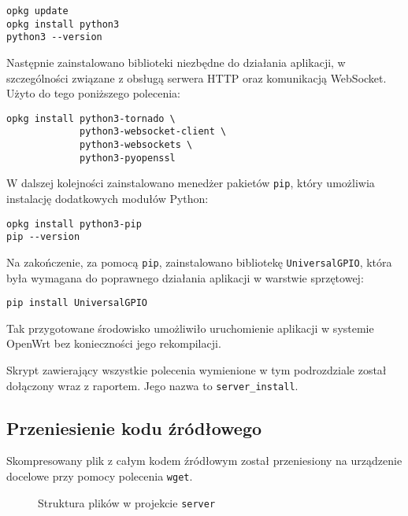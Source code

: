 \documentclass{article}
\begin{document}
\begin{verbatim}
opkg update
opkg install python3
python3 --version
\end{verbatim}

Następnie zainstalowano biblioteki niezbędne do działania aplikacji, w szczególności związane z obsługą serwera HTTP oraz komunikacją WebSocket. Użyto do tego poniższego polecenia:

\begin{verbatim}
opkg install python3-tornado \
             python3-websocket-client \
             python3-websockets \
             python3-pyopenssl
\end{verbatim}

W dalszej kolejności zainstalowano menedżer pakietów \texttt{pip}, który umożliwia instalację dodatkowych modułów Python:

\begin{verbatim}
opkg install python3-pip
pip --version
\end{verbatim}

Na zakończenie, za pomocą \texttt{pip}, zainstalowano bibliotekę \texttt{UniversalGPIO}, która była wymagana do poprawnego działania aplikacji w warstwie sprzętowej:

\begin{verbatim}
pip install UniversalGPIO
\end{verbatim}

Tak przygotowane środowisko umożliwiło uruchomienie aplikacji w systemie OpenWrt bez konieczności jego rekompilacji.

Skrypt zawierający wszystkie polecenia wymienione w tym podrozdziale został dołączony wraz z raportem. Jego nazwa to \texttt{server\_install}.

\subsection{Przeniesienie kodu źródłowego}

Skompresowany plik z całym kodem źródłowym został przeniesiony na urządzenie docelowe przy pomocy polecenia \texttt{wget}.

\begin{figure}[H]
    \caption{Struktura plików w projekcie \texttt{server}}
    \label{fig:tree}
\end{figure}
\end{document}
